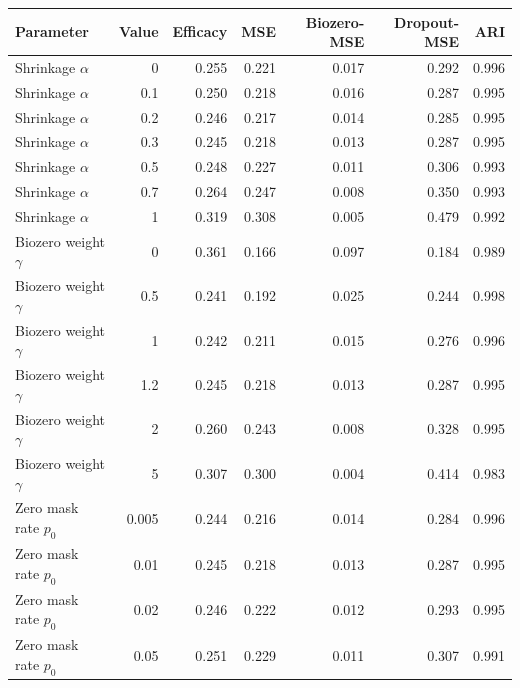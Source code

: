 \begin{tabular}{lrrrrrr}
\toprule
Parameter & Value & Efficacy & MSE & Biozero-MSE & Dropout-MSE & ARI \\
\midrule
Shrinkage $\alpha$ & 0 & 0.255 & 0.221 & 0.017 & 0.292 & 0.996 \\
Shrinkage $\alpha$ & 0.1 & 0.250 & 0.218 & 0.016 & 0.287 & 0.995 \\
Shrinkage $\alpha$ & 0.2 & 0.246 & 0.217 & 0.014 & 0.285 & 0.995 \\
Shrinkage $\alpha$ & 0.3 & 0.245 & 0.218 & 0.013 & 0.287 & 0.995 \\
Shrinkage $\alpha$ & 0.5 & 0.248 & 0.227 & 0.011 & 0.306 & 0.993 \\
Shrinkage $\alpha$ & 0.7 & 0.264 & 0.247 & 0.008 & 0.350 & 0.993 \\
Shrinkage $\alpha$ & 1 & 0.319 & 0.308 & 0.005 & 0.479 & 0.992 \\
Biozero weight $\gamma$ & 0 & 0.361 & 0.166 & 0.097 & 0.184 & 0.989 \\
Biozero weight $\gamma$ & 0.5 & 0.241 & 0.192 & 0.025 & 0.244 & 0.998 \\
Biozero weight $\gamma$ & 1 & 0.242 & 0.211 & 0.015 & 0.276 & 0.996 \\
Biozero weight $\gamma$ & 1.2 & 0.245 & 0.218 & 0.013 & 0.287 & 0.995 \\
Biozero weight $\gamma$ & 2 & 0.260 & 0.243 & 0.008 & 0.328 & 0.995 \\
Biozero weight $\gamma$ & 5 & 0.307 & 0.300 & 0.004 & 0.414 & 0.983 \\
Zero mask rate $p_0$ & 0.005 & 0.244 & 0.216 & 0.014 & 0.284 & 0.996 \\
Zero mask rate $p_0$ & 0.01 & 0.245 & 0.218 & 0.013 & 0.287 & 0.995 \\
Zero mask rate $p_0$ & 0.02 & 0.246 & 0.222 & 0.012 & 0.293 & 0.995 \\
Zero mask rate $p_0$ & 0.05 & 0.251 & 0.229 & 0.011 & 0.307 & 0.991 \\
\bottomrule
\end{tabular}
